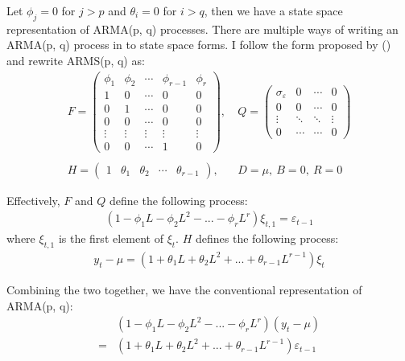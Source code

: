 \documentclass[10pt, titlepage]{article}
\numberwithin{equation}{section}
\begin{document}
Let $\phi_j=0$ for $j>p$ and $\theta_i=0$ for $i>q$, then we have a state space representation of ARMA(p, q) processes. There are multiple ways of writing an ARMA(p, q) process in to state space forms. I follow the form proposed by (\cite{hamilton_1994}) and rewrite ARMS(p, q) as:
\begin{align*}
    F = \begin{pmatrix}
        \phi_1 & \phi_2 & \cdots & \phi_{r-1} & \phi_r \\
        1 & 0 & \cdots & 0 & 0 \\
        0 & 1 & \cdots & 0 & 0 \\
        0 & 0 & \cdots & 0 & 0 \\
        \vdots & \vdots & \vdots & \vdots & \vdots \\
        0 & 0 & \cdots & 1 & 0
    \end{pmatrix}, 
    &\ 
    Q = \begin{pmatrix}
        \sigma_{\varepsilon} & 0 & \cdots & 0 \\ 
        0 & 0 & \cdots & 0 \\
        \vdots & \ddots & \ddots & \vdots \\ 
        0 & \cdots & \cdots & 0
    \end{pmatrix} \\ \\
    H = \begin{pmatrix}
        1 & \theta_1 & \theta_2 & \cdots & \theta_{r-1}
    \end{pmatrix}, 
    &\ 
    D = \mu, \ B = 0, \ R = 0
\end{align*}

Effectively, $F$ and $Q$ define the following process:
\begin{align*}
    (1-\phi_1L - \phi_2L^2 - ... - \phi_rL^r)\xi_{t,1} = \varepsilon_{t-1}
\end{align*}
where $\xi_{t, 1}$ is the first element of $\xi_{t}$. $H$ defines the following process:
\begin{align*}
    y_t - \mu = (1+\theta_1L+\theta_2L^2 + ... + \theta_{r-1}L^{r-1})\xi_{t}
\end{align*}

Combining the two together, we have the conventional representation of ARMA(p, q):
\begin{align*}
    &(1-\phi_1L - \phi_2L^2 - ... - \phi_rL^r)(y_t - \mu) \\
    =&(1+\theta_1L+\theta_2L^2 + ... + \theta_{r-1}L^{r-1})\varepsilon_{t-1}
\end{align*}
\end{document}
